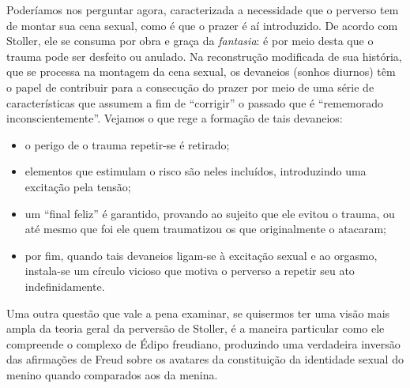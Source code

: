 Poderíamos nos perguntar agora, caracterizada a necessidade que o
perverso tem de montar sua cena sexual, como é que o prazer é aí
introduzido. De acordo com Stoller, ele se consuma por obra e graça da
\emph{fantasia}: é por meio desta que o trauma pode ser desfeito ou
anulado. Na reconstrução modificada de sua história, que se processa na
montagem da cena sexual, os devaneios (sonhos diurnos) têm o papel de
contribuir para a consecução do prazer por meio de uma série de
características que assumem a fim de ``corrigir'' o passado que é
``rememorado inconscientemente''. Vejamos o que rege a formação de tais
devaneios:

\begin{itemize}
\item
  o perigo de o trauma repetir-se é retirado;
\item
  elementos que estimulam o risco são neles incluídos, introduzindo uma
  excitação pela tensão;
\item
  um ``final feliz'' é garantido, provando ao sujeito que ele evitou o
  trauma, ou até mesmo que foi ele quem traumatizou os que originalmente
  o atacaram;
\item
  por fim, quando tais devaneios ligam-se à excitação sexual e ao
  orgasmo, instala-se um círculo vicioso que motiva o perverso a repetir
  seu ato indefinidamente.
\end{itemize}

Uma outra questão que vale a pena examinar, se quisermos ter uma visão
mais ampla da teoria geral da perversão de Stoller, é a maneira
particular como ele compreende o complexo de Édipo freudiano, produzindo
uma verdadeira inversão das afirmações de Freud sobre os avatares da
constituição da identidade sexual do menino quando comparados aos da
menina.

